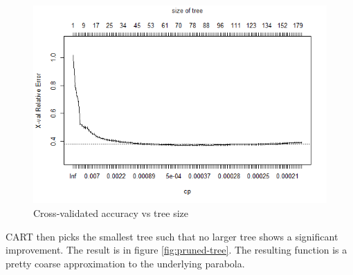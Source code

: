 \documentclass[10pt,openany]{article}
\numberwithin{definition}{section}
\numberwithin{example}{section}
\numberwithin{equation}{section}
\numberwithin{figure}{section}
\begin{document}
\begin{figure}
\noindent \begin{centering}
\includegraphics[width=12cm]{../fig/rpart-unpruned-plotcp}
\par\end{centering}

\protect\caption{\label{fig:Cross-validated-accuracy-vs}Cross-validated accuracy vs
tree size}
\end{figure}


CART then picks the smallest tree such that no larger tree shows a
significant improvement. The result is in figure \ref{fig:pruned-tree}.
The resulting function is a pretty coarse approximation to the underlying
parabola.
\end{document}
